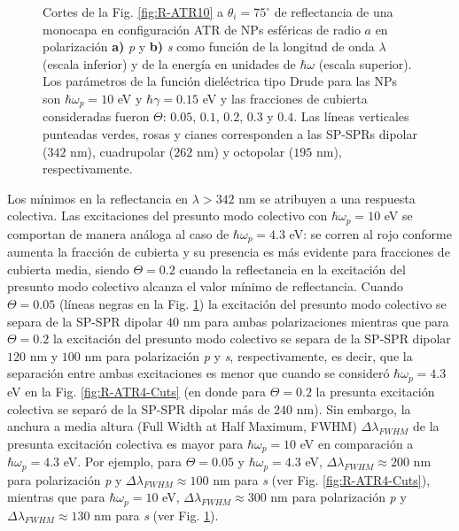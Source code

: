 \begin{figure}[h!]
	\caption{Cortes de la Fig. \ref{fig:R-ATR10} a $\theta_i = 75^\circ$ de reflectancia de una monocapa en configuración ATR de NPs esféricas de radio $a$ en polarización \textbf{a)} \emph{p} y \textbf{b)} \emph{s} como función de la longitud de onda $\lambda$ (escala inferior) y de la energía en unidades de $\hbar\omega$ (escala superior). Los parámetros de la función dieléctrica tipo Drude para las NPs son $\hbar\omega_p = 10$ eV y $\hbar\gamma = 0.15$ eV y las fracciones de cubierta consideradas fueron $\Theta$: $0. 05$, $0. 1$, $0. 2$, $0. 3$ y $0. 4$. Las líneas verticales punteadas verdes, rosas y cianes corresponden a las SP-SPRs dipolar ($342$ nm), cuadrupolar ($262$ nm) y octopolar ($195$ nm), respectivamente.  }\label{fig:R-ATR10-Cuts}
	\end{figure}	

Los mínimos en la reflectancia en $\lambda > 342$ nm se atribuyen a una respuesta colectiva. Las excitaciones del presunto modo colectivo con $\hbar\omega_p = 10$ eV se comportan de manera análoga al caso de $\hbar\omega_p = 4.3$ eV: se corren al rojo conforme aumenta la fracción de cubierta y su presencia es más evidente para fracciones de cubierta media, siendo  $\Theta=0.2$ cuando la reflectancia en la excitación del presunto modo colectivo alcanza el valor mínimo de reflectancia. Cuando $\Theta = 0.05$ (líneas negras en la Fig. \ref{fig:R-ATR10-Cuts}) la excitación del presunto modo colectivo se separa de la SP-SPR dipolar   $40$ nm para ambas polarizaciones mientras que para $\Theta = 0.2$ la excitación del presunto modo colectivo se separa de la SP-SPR dipolar  $120$ nm y $100$ nm para polarización \emph{p} y \emph{s}, respectivamente, es decir, que la separación entre ambas excitaciones es menor que cuando se consideró $\hbar\omega_p = 4.3$ eV en la Fig. \ref{fig:R-ATR4-Cuts} (en donde para $\Theta=0.2$ la presunta excitación colectiva se separó de la SP-SPR dipolar más de $240$ nm). Sin embargo, la anchura a media altura (Full Width at Half Maximum, FWHM) $\Delta\lambda_{FWHM}$ de la presunta excitación colectiva es mayor para $\hbar\omega_p=10$ eV en comparación a $\hbar\omega_p=4.3$ eV. Por ejemplo, para $\Theta = 0.05$ y $\hbar\omega_p = 4.3$ eV,  $\Delta\lambda_{FWHM}\approx 200$ nm para polarización \emph{p} y  $\Delta\lambda_{FWHM}\approx 100$ nm para  \emph{s} (ver Fig. \ref{fig:R-ATR4-Cuts}), mientras que para  $\hbar\omega_p = 10$ eV,  $\Delta\lambda_{FWHM}\approx 300$ nm para polarización \emph{p} y  $\Delta\lambda_{FWHM}\approx 130$ nm para  \emph{s} (ver Fig. \ref{fig:R-ATR10-Cuts}).


